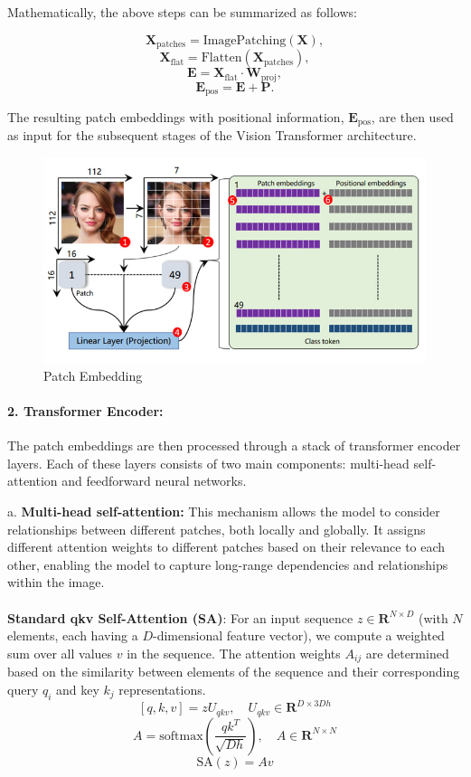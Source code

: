 \noindent Mathematically, the above steps can be summarized as follows:

\[
    \mathbf{X}_\text{patches} = \text{ImagePatching}(\mathbf{X}),
\]
\[
    \mathbf{X}_\text{flat} = \text{Flatten}(\mathbf{X}_\text{patches}),
\]
\[
    \mathbf{E} = \mathbf{X}_\text{flat} \cdot \mathbf{W}_\text{proj},
\]
\[
    \mathbf{E}_\text{pos} = \mathbf{E} + \mathbf{P}.
\]

The resulting patch embeddings with positional information, $\mathbf{E}_\text{pos}$, are then used as input for the subsequent stages of the Vision Transformer architecture.


\begin{figure}[htbp]
    \centering
    \includegraphics[width=6in]{img/patchembedding.jpg}
    \caption{Patch Embedding}
\end{figure}

\paragraph{2. Transformer Encoder:}
The patch embeddings are then processed through a stack of transformer encoder layers. Each of these layers consists of two main components: multi-head self-attention and feedforward neural networks.


\noindent a. \textbf{Multi-head self-attention:} This mechanism allows the model to consider relationships between different patches, both locally and globally. It assigns different attention weights to different patches based on their relevance to each other, enabling the model to capture long-range dependencies and relationships within the image. \\
\\
\noindent \textbf{Standard qkv Self-Attention (SA)}:
For an input sequence $z \in \mathbf{R}^{N \times D}$ (with $N$ elements, each having a $D$-dimensional feature vector), we compute a weighted sum over all values $v$ in the sequence. The attention weights $A_{ij}$ are determined based on the similarity between elements of the sequence and their corresponding query $q_i$ and key $k_j$ representations.
\[
    [q, k, v] = zU_{qkv}, \quad U_{qkv} \in \mathbf{R}^{D \times 3Dh}
\]
\[
    A = \text{softmax}\left(\frac{qk^T}{\sqrt{Dh}}\right), \quad A \in \mathbf{R}^{N \times N}
\]
\[
    \text{SA}(z) = Av
\]

